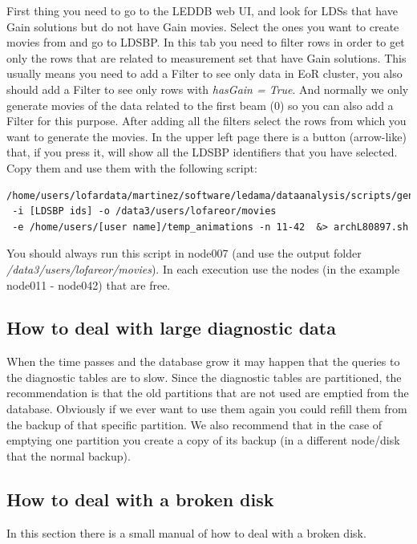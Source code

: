 \documentclass[a4paper,11pt]{article}
\begin{document}
First thing you need to go to the LEDDB web UI, and look for LDSs that have Gain solutions but do not have Gain movies. Select the ones you want to create movies from and go to LDSBP. In this tab you need to filter rows in order to get only the rows that are related to measurement set that have Gain solutions. This usually means you need to add a Filter to see only data in EoR cluster, you also should add a Filter to see only rows with \textit{hasGain = True}. And normally we only generate movies of the data related to the first beam (0) so you can also add a Filter for this purpose. After adding all the filters select the rows from which you want to generate the movies. In the upper left page there is a button (arrow-like) that, if you press it, will show all the LDSBP identifiers that you have selected. Copy them and use them with the following script:

\begin{verbatim}
/home/users/lofardata/martinez/software/ledama/dataanalysis/scripts/gengainmovies.py
 -i [LDSBP ids] -o /data3/users/lofareor/movies 
 -e /home/users/[user name]/temp_animations -n 11-42  &> archL80897.sh
\end{verbatim}

You should always run this script in node007 (and use the output folder \textit{/data3/users/lofareor/movies}). In each execution use the nodes (in the example node011 - node042) that are free.

\subsection{How to deal with large diagnostic data} 

When the time passes and the database grow it may happen that the queries to the diagnostic tables are to slow. Since the diagnostic tables are partitioned, the recommendation is that the old partitions that are not used are emptied from the database. Obviously if we ever want to use them again you could refill them from the backup of that specific partition. We also recommend that in the case of emptying one partition you create a copy of its backup (in a different node/disk that the normal backup).

\subsection{How to deal with a broken disk} 
\label{sec:brokendisk}
In this section there is a small manual of how to deal with a broken disk.
\end{document}
